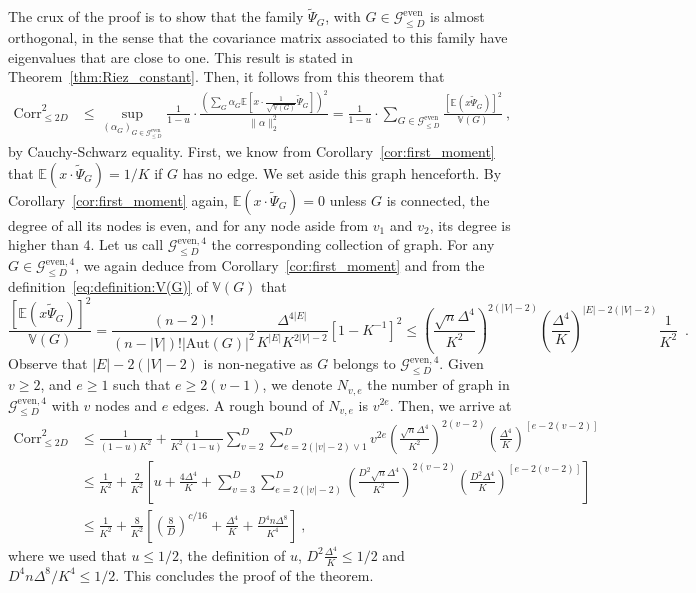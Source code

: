 \documentclass{article}
\begin{document}
The crux of the proof is to show that the family $\widetilde{\Psi}_G$, with $G\in \mathcal{G}_{\leq D}^{\mathrm{even}}$ is almost orthogonal, in the sense that the covariance matrix associated to this family have eigenvalues that are close to one. This result is stated in Theorem~\ref{thm:Riez_constant}.
Then, it follows from this theorem that 
\begin{align*}
    \mathrm{Corr}^2_{\leq 2D} &\leq 
     \sup_{(\alpha_G)_{G\in \mathcal G^{\mathrm{even}}_{\leq D}}} \frac{1}{1-u}\cdot \frac{\left(\sum_G \alpha_G \mathbb E\left[x \cdot \frac{1}{\sqrt{\mathbb V(G)}}\widetilde{\Psi}_{G}\right]\right)^2}{\|\alpha\|_2^2} = \frac{1}{1-u}\cdot \sum_{G\in \mathcal G^{\mathrm{even}}_{\leq D}} \frac{\left[\mathbb{E}(x  \widetilde{\Psi}_{G})\right]^2}{\mathbb{V}(G)}\ , 
\end{align*}
by Cauchy-Schwarz equality. First, we know from Corollary~\ref{cor:first_moment} that $\mathbb{E}(x \cdot \widetilde{\Psi}_{G})=1/K$ if $G$ has no edge. We set aside this graph henceforth. 
 By Corollary~\ref{cor:first_moment} again, $\mathbb{E}(x \cdot \widetilde{\Psi}_{G})=0$ unless $G$ is connected, the degree of all its nodes is even, and for any node aside from $v_1$ and $v_2$, its degree is higher than $4$. Let us call $\mathcal G^{\mathrm{even,4}}_{\leq D}$ the corresponding collection of graph. For any $G\in \mathcal G^{\mathrm{even,4}}_{\leq D}$, we again deduce from Corollary~\ref{cor:first_moment} and from the definition~\eqref{eq:definition:V(G)} of $\mathbb{V}(G)$ that 
\[
\frac{\left[\mathbb{E}(x  \widetilde{\Psi}_{G})\right]^2}{\mathbb{V}(G)}= \frac{(n-2)!}{(n-|V|)!|\mathrm{Aut}(G)|^2}\frac{\Delta^{4|E|}}{K^{|E|}K^{2|V|-2}} [1 - K^{-1}]^2\leq \left(\frac{\sqrt{n}\Delta^4}{K^2}\right)^{2(|V|-2)}  \left(\frac{\Delta^4}{K}\right)^{|E|-2(|V|-2)}  \frac{1}{K^2}\enspace . 
\]
Observe that $|E|-2(|V|-2)$ is non-negative as $G$ belongs to $ \mathcal G^{\mathrm{even,4}}_{\leq D}$.
Given $v\geq 2$, and $e\geq 1$ such that $e\geq 2(v-1)$, we denote $N_{v,e}$ the number of graph in $ \mathcal G^{\mathrm{even,4}}_{\leq D}$ with $v$ nodes and $e$ edges. A rough bound of $N_{v,e}$ is $v^{2e}$. Then, we arrive at 
\begin{align*}
    \mathrm{Corr}^2_{\leq 2D} 
    &\leq \frac{1}{(1-u)K^2}+ \frac{1}{K^2(1-u)}\sum_{v=2}^{D}\sum_{e = 2(|v|-2)\vee 1}^{D} v^{2e} \left(\frac{\sqrt{n}\Delta^4}{K^2}\right)^{2(v-2)} \left(\frac{\Delta^{4}}{K}\right)^{[e - 2(v-2)]}\\
    &\leq \frac{1}{K^2}+ \frac{2}{K^2} \left[u + \frac{4\Delta^4}{K}+\sum_{v=3}^{D}\sum_{e = 2(|v|-2)}^{D}  \left(\frac{D^2\sqrt{n}\Delta^4}{K^2}\right)^{2(v-2)} \left(\frac{D^2\Delta^{4}}{K}\right)^{[e - 2(v-2)]}  \right]\\
    &\leq \frac{1}{K^2}+   \frac{8}{K^2} \left[\left(\frac{8}{D}\right)^{c/16}
        + \frac{\Delta^4}{K}+  \frac{D^4n \Delta^8}{K^4}  \right]\ , 
\end{align*}
where we used that $u\leq 1/2$, the definition of $u$, $D^2\frac{\Delta^{4}}{K} \leq 1/2$ and $D^4n\Delta^8/K^4 \leq 1/2$. This concludes the proof of the theorem. 
\end{document}
